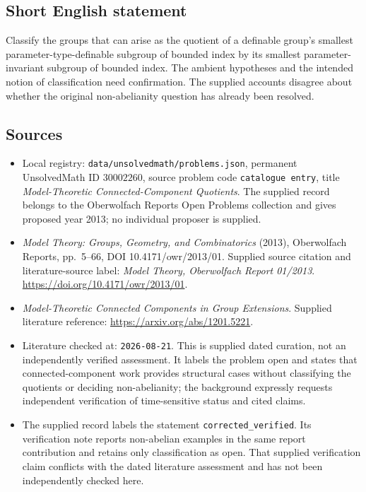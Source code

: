 \documentclass[11pt]{article}
\begin{document}
\subsection{Short English statement}
Classify the groups that can arise as the quotient of a definable group's smallest parameter-type-definable subgroup of bounded index by its smallest parameter-invariant subgroup of bounded index. The ambient hypotheses and the intended notion of classification need confirmation. The supplied accounts disagree about whether the original non-abelianity question has already been resolved.
\subsection{Sources}
\begin{itemize}
\item Local registry: \texttt{data/unsolvedmath/problems.json}, permanent UnsolvedMath ID \(30002260\), source problem code \texttt{catalogue entry}, title \emph{Model-Theoretic Connected-Component Quotients}. The supplied record belongs to the Oberwolfach Reports Open Problems collection and gives proposed year 2013; no individual proposer is supplied.
\item \emph{Model Theory: Groups, Geometry, and Combinatorics} (2013), Oberwolfach Reports, pp.\ 5--66, DOI 10.4171/owr/2013/01. Supplied source citation and literature-source label: \emph{Model Theory, Oberwolfach Report 01/2013}. \url{https://doi.org/10.4171/owr/2013/01}.
\item \emph{Model-Theoretic Connected Components in Group Extensions}. Supplied literature reference: \url{https://arxiv.org/abs/1201.5221}.
\item Literature checked at: \texttt{2026-08-21}. This is supplied dated curation, not an independently verified assessment. It labels the problem open and states that connected-component work provides structural cases without classifying the quotients or deciding non-abelianity; the background expressly requests independent verification of time-sensitive status and cited claims.
\item The supplied record labels the statement \texttt{corrected\_verified}. Its verification note reports non-abelian examples in the same report contribution and retains only classification as open. That supplied verification claim conflicts with the dated literature assessment and has not been independently checked here.
\end{itemize}
\end{document}
